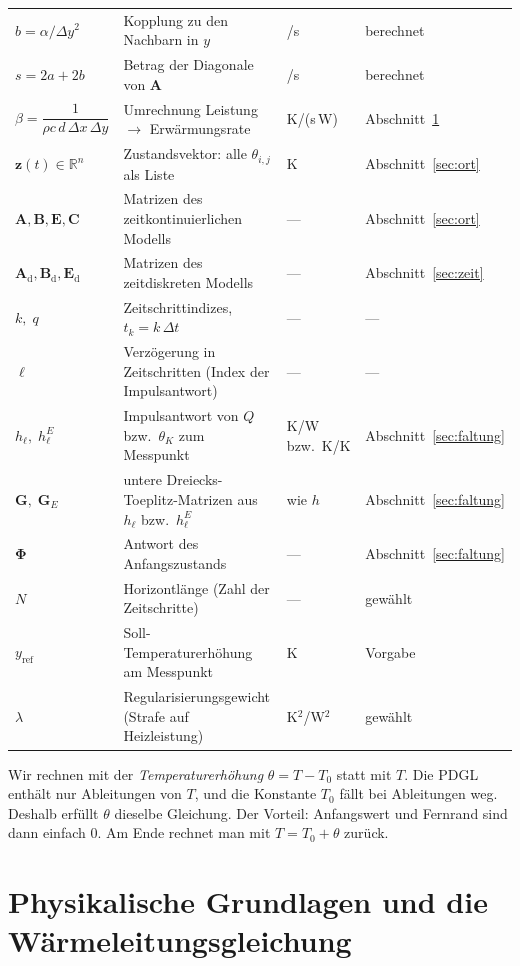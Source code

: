 \documentclass[11pt,a4paper]{article}
\numberwithin{equation}{section}
\newcommand{\dx}{\Delta x}
\newcommand{\dy}{\Delta y}
\newcommand{\dt}{\Delta t}
\newcommand{\thK}{\theta_{K}}
\newcommand{\mA}{\mathbf{A}}
\newcommand{\mB}{\mathbf{B}}
\newcommand{\mE}{\mathbf{E}}
\newcommand{\mC}{\mathbf{C}}
\newcommand{\mG}{\mathbf{G}}
\newcommand{\mGE}{\mathbf{G}_{E}}
\newcommand{\mAd}{\mathbf{A}_{\mathrm d}}
\newcommand{\mBd}{\mathbf{B}_{\mathrm d}}
\newcommand{\mEd}{\mathbf{E}_{\mathrm d}}
\newcommand{\mPhi}{\symbf{\Phi}}
\newcommand{\vz}{\mathbf{z}}
\newcommand{\Rn}{\mathbb{R}}
\begin{document}
\begin{longtable}{@{}>{\RaggedRight}p{2.4cm}>{\RaggedRight}p{6.4cm}>{\RaggedRight}p{1.9cm}>{\RaggedRight}p{3.2cm}@{}}
$b=\alpha/\dy^2$ & Kopplung zu den Nachbarn in $y$ & 1/s & berechnet \\
$s=2a+2b$ & Betrag der Diagonale von $\mA$ & 1/s & berechnet \\
$\beta=\dfrac{1}{\rho c\,d\,\dx\,\dy}$ & Umrechnung Leistung $\to$ Erwärmungsrate & K/(s\,W) & Abschnitt~\ref{sec:pdgl} \\
$\vz(t)\in\Rn^n$ & Zustandsvektor: alle $\theta_{i,j}$ als Liste & K & Abschnitt~\ref{sec:ort} \\
$\mA,\mB,\mE,\mC$ & Matrizen des zeitkontinuierlichen Modells & --- & Abschnitt~\ref{sec:ort} \\
$\mAd,\mBd,\mEd$ & Matrizen des zeitdiskreten Modells & --- & Abschnitt~\ref{sec:zeit} \\
$k,\;q$ & Zeitschrittindizes, $t_k=k\,\dt$ & --- & --- \\
$\ell$ & Verzögerung in Zeitschritten (Index der Impulsantwort) & --- & --- \\
$h_\ell,\;h^E_\ell$ & Impulsantwort von $Q$ bzw.\ $\thK$ zum Messpunkt & K/W bzw.\ K/K & Abschnitt~\ref{sec:faltung} \\
$\mG,\;\mGE$ & untere Dreiecks-Toeplitz-Matrizen aus $h_\ell$ bzw.\ $h^E_\ell$ & wie $h$ & Abschnitt~\ref{sec:faltung} \\
$\mPhi$ & Antwort des Anfangszustands & --- & Abschnitt~\ref{sec:faltung} \\
$N$ & Horizontlänge (Zahl der Zeitschritte) & --- & gewählt \\
$y_\mathrm{ref}$ & Soll-Temperaturerhöhung am Messpunkt & K & Vorgabe \\
$\lambda$ & Regularisierungsgewicht (Strafe auf Heizleistung) & K$^2$/W$^2$ & gewählt \\
\bottomrule
\end{longtable}

Wir rechnen mit der \emph{Temperaturerhöhung} $\theta=T-T_0$ statt mit $T$. Die PDGL enthält nur Ableitungen von $T$, und die Konstante $T_0$ fällt bei Ableitungen weg. Deshalb erfüllt $\theta$ dieselbe Gleichung. Der Vorteil: Anfangswert und Fernrand sind dann einfach $0$. Am Ende rechnet man mit $T=T_0+\theta$ zurück.

\section{Physikalische Grundlagen und die Wärmeleitungsgleichung}
\label{sec:pdgl}
\end{document}
